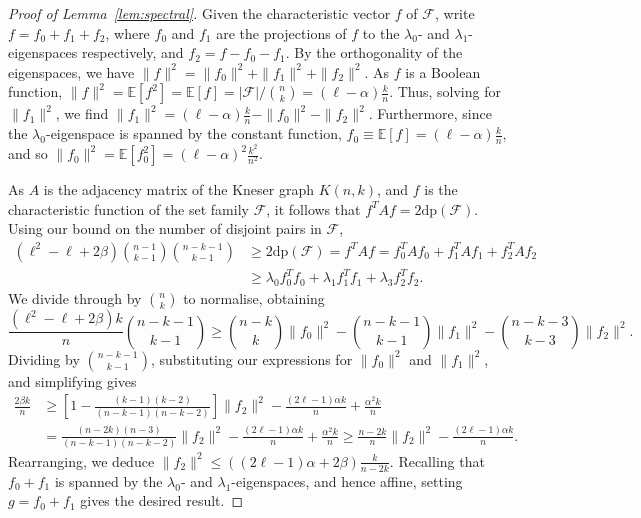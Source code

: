 \documentclass[11pt]{article}
\theoremstyle{definition}
\newcommand{\al}{\alpha}
\newcommand{\cF}{\mathcal{F}}
\newcommand{\3}{\bf{3}}
\renewcommand{\l}{\ensuremath{\ell}}
\newcommand{\card}[1]{\left| #1 \right|}
\newcommand{\disj}{\mathrm{dp}}
\newcommand{\Exp}{\mathbb{E}}
\begin{document}
\begin{proof}[Proof of Lemma~\ref{lem:spectral}]
Given the characteristic vector $f$ of $\cF$, write $f = f_0 + f_1 + f_2$, where $f_0$ and $f_1$ are the projections of $f$ to the $\lambda_0$- and $\lambda_1$-eigenspaces respectively, and $f_2 = f - f_0 - f_1$.  By the orthogonality of the eigenspaces, we have $\| f \|^2 = \| f_0 \|^2 + \| f_1 \|^2 + \| f_2 \|^2$.  As $f$ is a Boolean function, $\| f \|^2 = \Exp[ f^2 ] = \Exp[ f] = \card{\cF} / \binom{n}{k} = (\l-\alpha) \frac{k}{n}$.  Thus, solving for $\|f_1\|^2$, we find $\| f_1 \|^2 = (\l - \alpha) \frac{k}{n} - \| f_0 \|^2 - \| f_2 \|^2$.  Furthermore, since the $\lambda_0$-eigenspace is spanned by the constant function, $f_0 \equiv \Exp[f] = (\l - \alpha) \frac{k}{n}$, and so $\|f_0\|^2 = \Exp \left[ f_0^2 \right] = (\l-\alpha)^2 \frac{k^2}{n^2}$.

As $A$ is the adjacency matrix of the Kneser graph $K(n,k)$, and $f$ is the characteristic function of the set family $\cF$, it follows that $f^T A f = 2 \disj(\cF)$.  Using our bound on the number of disjoint pairs in $\cF$,
\begin{align*}
	\left( \l^2 - \l + 2 \beta \right) \binom{n-1}{k-1} \binom{n-k-1}{k-1} &\ge 2 \disj(\cF) = f^T A f = f_0^T A f_0 + f_1^T A f_1 + f_2^T A f_2 \\
	&\ge \lambda_0 f_0^T f_0 + \lambda_1 f_1^T f_1 + \lambda_3 f_2^T f_2.
\end{align*}
We divide through by $\binom{n}{k}$ to normalise, obtaining
\[ \frac{\left( \l^2 - \l + 2 \beta \right) k}{n} \binom{n-k-1}{k-1} \ge \binom{n-k}{k} \| f_0 \|^2 - \binom{n-k-1}{k-1} \| f_1 \|^2 - \binom{n-k-3}{k-3} \| f_2 \|^2. \]
Dividing by $\binom{n-k-1}{k-1}$, substituting our expressions for $\| f_0 \|^2$ and $\| f_1 \|^2$, and simplifying gives
\begin{align*}
	\frac{2 \beta k}{n} &\ge \left[ 1 - \frac{(k-1)(k-2)}{(n-k-1)(n-k-2)} \right] \| f_2 \|^2 - \frac{\left( 2\l - 1\right) \alpha k}{n} + \frac{\al^2 k}{n}\\
	&= \frac{(n-2k)(n-3) }{(n-k-1)(n-k-2)}\| f_2 \|^2 - \frac{\left( 2 \l - 1 \right) \al k}{n} + \frac{\al^2 k}{n} \ge \frac{n-2k}{n} \| f_2 \|^2 - \frac{ \left( 2 \l - 1 \right)\alpha k}{n}.
\end{align*}
Rearranging, we deduce $\| f_2 \|^2 \le ((2 \l - 1) \alpha + 2 \beta)\frac{k}{n-2k}$. Recalling that $f_0 + f_1$ is spanned by the $\lambda_0$- and $\lambda_1$-eigenspaces, and hence affine, setting $g = f_0 + f_1$ gives the desired result.
\end{proof}
\end{document}
